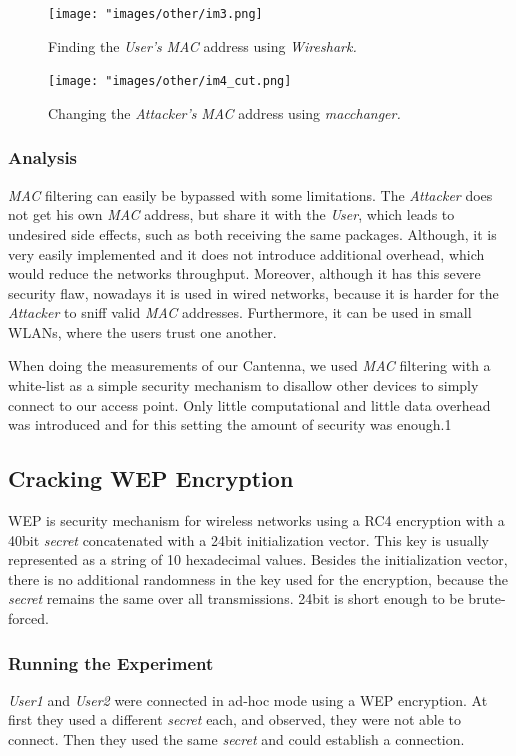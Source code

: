 \documentclass[12pt,a4paper]{article}
\begin{document}
	\begin{figure}
		\texttt{[image: "images/other/im3.png]}
		\caption{Finding the \emph{User's} \emph{MAC} address using \emph{Wireshark.}}
		\label{mac:wireshark}
	\end{figure}
	
	\begin{figure}
		\texttt{[image: "images/other/im4\_cut.png]}
		\caption{Changing the \emph{Attacker's} \emph{MAC} address using \emph{macchanger.}}
		\label{mac:changer}
	\end{figure}
	\subsubsection{Analysis}
	\emph{MAC} filtering can easily be bypassed with some limitations. The \emph{Attacker} does not get his own \emph{MAC} address, but share it with the \emph{User}, which leads to undesired side effects, such as both receiving the same packages. Although, it is very easily implemented and it does not introduce additional overhead, which would reduce the networks throughput. Moreover, although it has this severe security flaw, nowadays it is used in wired networks, because it is harder for the \emph{Attacker} to sniff valid \emph{MAC} addresses. Furthermore, it can be used in small WLANs, where the users trust one another.
	
	When doing the measurements of our Cantenna, we used \emph{MAC} filtering with a white-list as a simple security mechanism to disallow other devices to simply connect to our access point. Only little computational and little data overhead was introduced and for this setting the amount of security was enough.1
	
	\subsection{Cracking WEP Encryption}
	WEP is security mechanism for wireless networks using a RC4 encryption with a 40bit \emph{secret} concatenated with a 24bit initialization vector. This key is usually represented as a string of 10 hexadecimal values. Besides the initialization vector, there is no additional randomness in the key used for the encryption, because the \emph{secret} remains the same over all transmissions. 24bit is short enough to be brute-forced.\cite{wep}
	
	\subsubsection{Running the Experiment}
	\emph{User1} and \emph{User2} were connected in ad-hoc mode using a WEP encryption.
	At first they used a different \emph{secret} each, and observed, they were not able to connect. Then they used the same \emph{secret} and could establish a connection.
	
\end{document}
